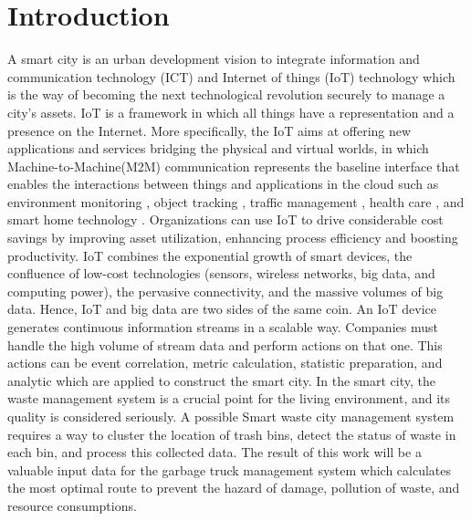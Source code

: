 \documentclass[conference,compsoc]{IEEEtran}
\begin{document}
\section{Introduction}
A smart city is an urban development vision to integrate information and communication technology (ICT) and Internet of things (IoT) technology which is the way of becoming the next technological revolution \cite{Delicato2013} securely to manage a city's assets. IoT is a framework in which all things have a representation and a presence on the Internet. More specifically, the IoT aims at offering new applications and services bridging the physical and virtual worlds, in which Machine-to-Machine(M2M) communication represents the baseline interface that enables the interactions between things and applications in the cloud such as environment monitoring \cite{Lazarescu2013}\cite{Kelly2013}, object tracking \cite{Gama2012}, traffic management \cite{Foschini2011}, health care \cite{Jara2011}, and smart home technology \cite{Tozlu2012}\cite{Li2011}. Organizations can use IoT to drive considerable cost savings by improving asset utilization, enhancing process efficiency and boosting productivity. IoT combines the exponential growth of smart devices,  the confluence of low-cost technologies (sensors, wireless networks, big data, and computing power), the pervasive connectivity, and the massive volumes of big data. Hence, IoT and big data are two sides of the same coin. An IoT device generates continuous information streams in a scalable way. Companies must handle the high volume of stream data and perform actions on that one. This actions can be event correlation, metric calculation, statistic preparation, and analytic which are applied to construct the smart city. In the smart city, the waste management system is a crucial point for the living environment, and its quality is considered seriously. A possible Smart waste city management system requires a way to cluster the location of trash bins, detect the status of waste in each bin, and process this collected data. The result of this work will be a valuable input data for the garbage truck management system which calculates the most optimal route to prevent the hazard of damage, pollution of waste, and resource consumptions. 
\end{document}
